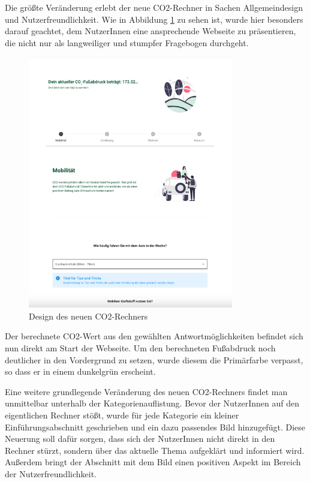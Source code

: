 Die größte Veränderung erlebt der neue CO2-Rechner in Sachen Allgemeindesign und Nutzerfreundlichkeit.
Wie in Abbildung \ref{fig:new-co2runter-calculator-design} zu sehen ist, wurde hier besonders darauf geachtet, dem NutzerInnen eine ansprechende Webseite zu präsentieren, die nicht nur als langweiliger und stumpfer Fragebogen durchgeht.

\begin{figure}[H]
    \centering
    \includegraphics[width=0.8\textwidth]{images/06/Calculator_New_Design.png}
    \caption{Design des neuen CO2-Rechners}
    \label{fig:new-co2runter-calculator-design}
\end{figure}

Der berechnete CO2-Wert aus den gewählten Antwortmöglichkeiten befindet sich nun direkt am Start der Webseite.
Um den berechneten Fußabdruck noch deutlicher in den Vordergrund zu setzen, wurde diesem die Primärfarbe verpasst, so dass er in einem dunkelgrün erscheint.

Eine weitere grundlegende Veränderung des neuen CO2-Rechners findet man unmittelbar unterhalb der Kategorienauflistung.
Bevor der NutzerInnen auf den eigentlichen Rechner stößt, wurde für jede Kategorie ein kleiner Einführungsabschnitt geschrieben und ein dazu passendes Bild hinzugefügt.
Diese Neuerung soll dafür sorgen, dass sich der NutzerInnen nicht direkt in den Rechner stürzt, sondern über das aktuelle Thema aufgeklärt und informiert wird.
Außerdem bringt der Abschnitt mit dem Bild einen positiven Aspekt im Bereich der Nutzerfreundlichkeit.

